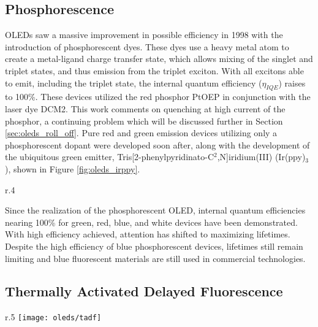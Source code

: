 \documentclass[../thesis.tex]{subfiles}
\begin{document}
\subsection{Phosphorescence}
OLEDs saw a massive improvement in possible efficiency in 1998 with the introduction of phosphorescent dyes.\supercite{Baldo1998a}
These dyes use a heavy metal atom to create a metal-ligand charge transfer state, which allows mixing of the singlet and triplet states, and thus emission from the triplet exciton.
With all excitons able to emit, including the triplet state, the internal quantum efficiency ($\eta_{IQE}$) raises to 100\%.
These devices utilized the red phosphor PtOEP in conjunction with the laser dye DCM2.
This work comments on quenching at high current of the phosphor, a continuing problem which will be discussed further in Section \ref{sec:oleds_roll_off}.\supercite{Reineke2007,Hershey2016}
Pure red and green emission devices utilizing only a phosphorescent dopant were developed soon after, along with the development of the ubiquitous green emitter, Tris[2-phenylpyridinato-C$^2$,N]iridium(III) (Ir(ppy)$_3$), shown in Figure \ref{fig:oleds_irppy}.\supercite{OBrien1999a,Adachi2000}

\begin{wrapfigure}{r}{.4\textwidth}
\centering
\setatomsep{2em}
\caption{Molecular structure of the green phosphor, \irppy}
\label{fig:oleds_irppy}
\end{wrapfigure}

Since the realization of the phosphorescent OLED, internal quantum efficiencies nearing 100\% for green, red, blue, and white devices have been demonstrated.\supercite{Su2008a,Erickson2010}
With high efficiency achieved, attention has shifted to maximizing lifetimes.\supercite{Scholz2008}
Despite the high efficiency of blue phosphorescent devices, lifetimes still remain limiting and blue fluorescent materials are still used in commercial technologies.


\subsection{Thermally Activated Delayed Fluorescence}

\begin{wrapfigure}{r}{.5\textwidth}
\texttt{[image: oleds/tadf]}
\caption{Reverse intersystem crossing for TADF materials.  Figure taken from \textcite{Uoyama2012}.}
\label{fig:oleds_tadf}
\end{wrapfigure}
\end{document}
